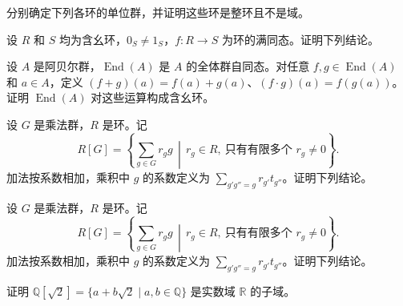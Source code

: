 \noindent\begin{minipage}{\textwidth}
分别确定下列各环的单位群，并证明这些环是整环且不是域。
\end{minipage}\par\vfill
\noindent\begin{minipage}{\textwidth}
设 $R$ 和 $S$ 均为含幺环，$0_S\ne 1_S$，$f\colon R\to S$ 为环的满同态。证明下列结论。
\end{minipage}\par\vfill
\newpage
\noindent\begin{minipage}{\textwidth}
设 $A$ 是阿贝尔群，$\operatorname{End}(A)$ 是 $A$ 的全体群自同态。对任意 $f,g\in\operatorname{End}(A)$ 和 $a\in A$，定义 $(f+g)(a)=f(a)+g(a)$、$(f\cdot g)(a)=f(g(a))$。证明 $\operatorname{End}(A)$ 对这些运算构成含幺环。
\end{minipage}\par\vfill
\noindent\begin{minipage}{\textwidth}
设 $G$ 是乘法群，$R$ 是环。记
\[
R[G]=\left\{\sum_{g\in G}r_g g \,\middle|\, r_g\in R,\ \text{只有有限多个 }r_g\ne 0\right\}.
\]
加法按系数相加，乘积中 $g$ 的系数定义为 $\sum_{g'g''=g}r_{g'}t_{g''}$。证明下列结论。
\end{minipage}\par\vfill
\noindent\begin{minipage}{\textwidth}
设 $G$ 是乘法群，$R$ 是环。记
\[
R[G]=\left\{\sum_{g\in G}r_g g \,\middle|\, r_g\in R,\ \text{只有有限多个 }r_g\ne 0\right\}.
\]
加法按系数相加，乘积中 $g$ 的系数定义为 $\sum_{g'g''=g}r_{g'}t_{g''}$。证明下列结论。
\end{minipage}\par\vfill
\newpage
\noindent\begin{minipage}{\textwidth}
证明 $\mathbb{Q}[\sqrt{2}]=\{a+b\sqrt{2}\mid a,b\in\mathbb{Q}\}$ 是实数域 $\mathbb{R}$ 的子域。
\end{minipage}\par\vfill
